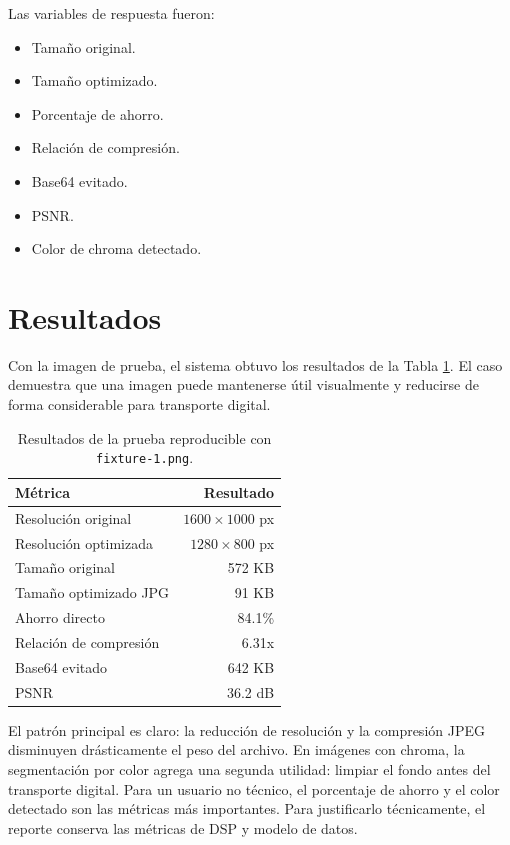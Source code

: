\documentclass[12pt,letterpaper]{article}
\begin{document}
Las variables de respuesta fueron:
\begin{itemize}
  \item Tamaño original.
  \item Tamaño optimizado.
  \item Porcentaje de ahorro.
  \item Relación de compresión.
  \item Base64 evitado.
  \item PSNR.
  \item Color de chroma detectado.
\end{itemize}

\section{Resultados}
Con la imagen de prueba, el sistema obtuvo los resultados de la Tabla \ref{tab:resultados}. El caso demuestra que una imagen puede mantenerse útil visualmente y reducirse de forma considerable para transporte digital.

\begin{table}[H]
\centering
\caption{Resultados de la prueba reproducible con \texttt{fixture-1.png}.}
\label{tab:resultados}
\begin{tabular}{l r}
\toprule
Métrica & Resultado\\
\midrule
Resolución original & \(1600\times1000\) px\\
Resolución optimizada & \(1280\times800\) px\\
Tamaño original & 572 KB\\
Tamaño optimizado JPG & 91 KB\\
Ahorro directo & 84.1\%\\
Relación de compresión & 6.31x\\
Base64 evitado & 642 KB\\
PSNR & 36.2 dB\\
\bottomrule
\end{tabular}
\end{table}

El patrón principal es claro: la reducción de resolución y la compresión JPEG disminuyen drásticamente el peso del archivo. En imágenes con chroma, la segmentación por color agrega una segunda utilidad: limpiar el fondo antes del transporte digital. Para un usuario no técnico, el porcentaje de ahorro y el color detectado son las métricas más importantes. Para justificarlo técnicamente, el reporte conserva las métricas de DSP y modelo de datos.
\end{document}
